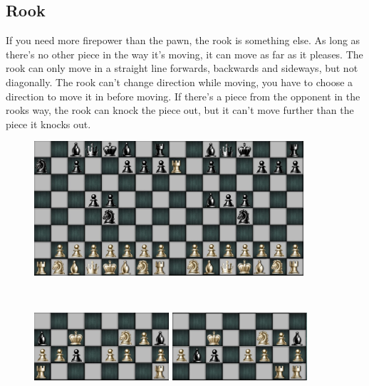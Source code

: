 \documentclass{article}
\begin{document}
\subsection*{Rook} If you need more firepower than the pawn, the rook is something else. As long as there’s no other piece in the way it’s moving, it can move as far as it pleases. The rook can only move in a straight line forwards, backwards and sideways, but not diagonally. The rook can’t change direction while moving, you have to choose a direction to move it in before moving. If there’s a piece from the opponent in the rooks way, the rook can knock the piece out, but it can’t move further than the piece it knocks out.
\begin{figure}[h]
\includegraphics[width=5cm, height=5cm]{rook1}\includegraphics[width=5cm, height=5cm]{rook2} \includegraphics[width=5cm, height=5cm]{rook3} \includegraphics[width=5cm, height=5cm]{rook4}
\end{figure}
\end{document}
